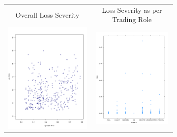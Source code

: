 \documentclass{DissertateUSU}
\begin{document}
\begin{figure}
\begin{subfigure}[b]{0.55\textwidth}
   \begin{frame}
      \centering
       \begin{tabular}{cc}
        Overall Loss Severity & Loss Severity as per Trading Role \\
        \includegraphics[height=5.5cm, width=7.5cm]{IntraDayUpdatedTime.pdf}
         &
         \includegraphics[height=5.0cm, width=7cm]{TrendTraderId.pdf}
         \end{tabular}
    \end{frame}
   \label{Intra_Day_Trends} 
\end{subfigure}


\end{figure}
\end{document}
